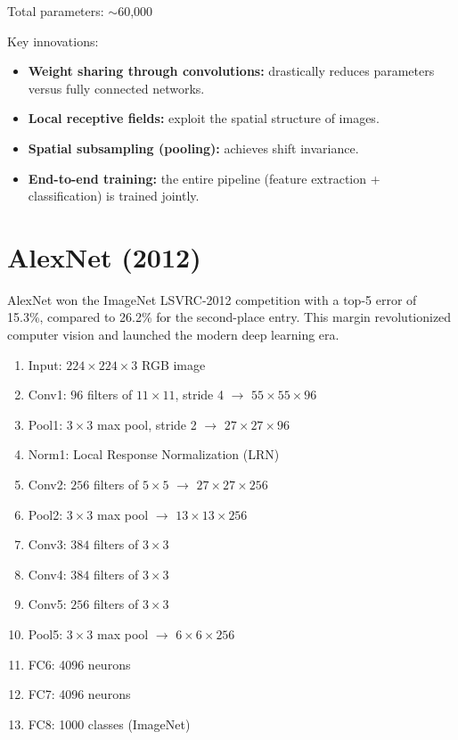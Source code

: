 Total parameters: $\sim$60{,}000

Key innovations:
\begin{itemize}
    \item \textbf{Weight sharing through convolutions:} drastically reduces parameters versus fully connected networks.
    \item \textbf{Local receptive fields:} exploit the spatial structure of images.
    \item \textbf{Spatial subsampling (pooling):} achieves shift invariance.
    \item \textbf{End-to-end training:} the entire pipeline (feature extraction + classification) is trained jointly.
\end{itemize}

\section{AlexNet (2012)}

AlexNet \cite{krizhevsky2012imagenet} won the ImageNet LSVRC-2012 competition with a top-5 error of 15.3\%, compared to 26.2\% for the second-place entry. This margin revolutionized computer vision and launched the modern deep learning era.

\begin{architecture}
\begin{enumerate}
    \item Input: $224\times224\times3$ RGB image
    \item Conv1: $96$ filters of $11\times11$, stride 4 $\rightarrow$ $55\times55\times96$
    \item Pool1: $3\times3$ max pool, stride 2 $\rightarrow$ $27\times27\times96$
    \item Norm1: Local Response Normalization (LRN)
    \item Conv2: $256$ filters of $5\times5$ $\rightarrow$ $27\times27\times256$
    \item Pool2: $3\times3$ max pool $\rightarrow$ $13\times13\times256$
    \item Conv3: $384$ filters of $3\times3$
    \item Conv4: $384$ filters of $3\times3$
    \item Conv5: $256$ filters of $3\times3$
    \item Pool5: $3\times3$ max pool $\rightarrow$ $6\times6\times256$
    \item FC6: 4096 neurons
    \item FC7: 4096 neurons
    \item FC8: 1000 classes (ImageNet)
\end{enumerate}
\end{architecture}


